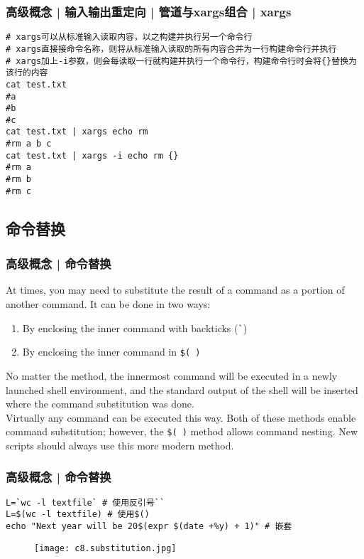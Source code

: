 \begin{frame}[fragile]
  \frametitle{高级概念 | 输入输出重定向 | 管道与xargs组合 | xargs}
\begin{lstlisting}
# xargs可以从标准输入读取内容，以之构建并执行另一个命令行
# xargs直接接命令名称，则将从标准输入读取的所有内容合并为一行构建命令行并执行
# xargs加上-i参数，则会每读取一行就构建并执行一个命令行，构建命令行时会将{}替换为该行的内容
cat test.txt
#a
#b
#c
cat test.txt | xargs echo rm 
#rm a b c
cat test.txt | xargs -i echo rm {}
#rm a
#rm b
#rm c
\end{lstlisting}
\end{frame}

\subsection{命令替换}
\begin{frame}[fragile]
  \frametitle{高级概念 | 命令替换}
  At times, you may need to substitute the result of a command as a portion of another command. It can be done in two ways:
  \begin{enumerate}
    \item By enclosing the inner command with backticks (\verb|`|)
    \item By enclosing the inner command in \verb|$( )|
  \end{enumerate}
  No matter the method, the innermost command will be executed in a newly launched shell environment, and the standard output of the shell will be inserted where the command substitution was done.\\
  \vspace{0.3cm}
  Virtually any command can be executed this way. Both of these methods enable command substitution; however, the \verb|$( )| method allows command nesting. New scripts should always use this more modern method.
\end{frame}

\begin{frame}[fragile]
  \frametitle{高级概念 | \alert{命令替换}}
\begin{lstlisting}
L=`wc -l textfile` # 使用反引号``
L=$(wc -l textfile) # 使用$()
echo "Next year will be 20$(expr $(date +%y) + 1)" # 嵌套
\end{lstlisting}
  \begin{figure}
    \centering
    \texttt{[image: c8.substitution.jpg]}
  \end{figure}
\end{frame}

